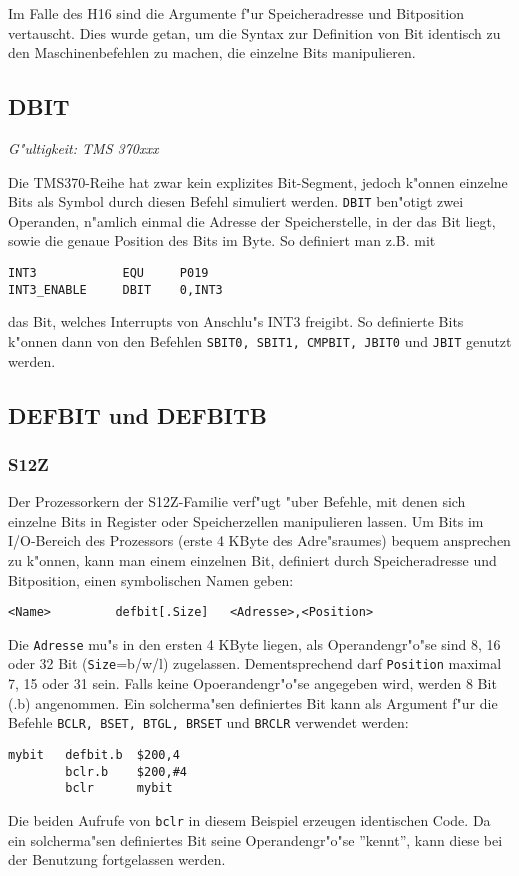 \documentclass[12pt,a4paper,twoside]{report}
\makeatletter
\newcommand{\tty}[1]{{\tt #1}}
\newcommand{\ttindex}[1]{\index{#1@{\tt #1}}}
\makeatother
\begin{document}
Im Falle des H16 sind die Argumente f"ur Speicheradresse und Bitposition
vertauscht.  Dies wurde getan, um die Syntax zur Definition von Bit identisch
zu den Maschinenbefehlen zu machen, die einzelne Bits manipulieren.


\subsection{DBIT}
\ttindex{DBIT}

{\em G"ultigkeit: TMS 370xxx}

Die TMS370-Reihe hat zwar kein explizites Bit-Segment, jedoch k"onnen
einzelne Bits als Symbol durch diesen Befehl simuliert werden.  \tty{DBIT}
ben"otigt zwei Operanden, n"amlich einmal die Adresse der Speicherstelle,
in der das Bit liegt, sowie die genaue Position des Bits im Byte.
So definiert man z.B. mit
\begin{verbatim}
INT3            EQU     P019
INT3_ENABLE     DBIT    0,INT3
\end{verbatim}
das Bit, welches Interrupts von Anschlu"s INT3 freigibt.  So definierte
Bits k"onnen dann von den Befehlen \tty{SBIT0, SBIT1, CMPBIT, JBIT0}
und \tty{JBIT} genutzt werden.


\subsection{DEFBIT und DEFBITB}
\ttindex{DEFBIT}
\ttindex{DEFBITB}

\subsubsection{S12Z}

Der Prozessorkern der S12Z-Familie verf"ugt "uber Befehle, mit denen
sich einzelne Bits in Register oder Speicherzellen manipulieren
lassen.  Um Bits im I/O-Bereich des Prozessors (erste 4 KByte des
Adre"sraumes) bequem ansprechen zu k"onnen, kann man einem einzelnen
Bit, definiert durch Speicheradresse und Bitposition, einen
symbolischen Namen geben:
\begin{verbatim}
<Name>         defbit[.Size]   <Adresse>,<Position>
\end{verbatim}
Die \tty{Adresse} mu"s in den ersten 4 KByte liegen, als Operandengr"o"se
sind 8, 16 oder 32 Bit (\tty{Size}=b/w/l) zugelassen.
Dementsprechend darf \tty{Position} maximal 7, 15 oder 31 sein. 
Falls keine Opoerandengr"o"se angegeben wird, werden 8 Bit (.b)
angenommen.  Ein solcherma"sen definiertes Bit kann als Argument f"ur
die Befehle {\tt BCLR, BSET, BTGL, BRSET} und {\tt BRCLR} verwendet
werden:
\begin{verbatim}
mybit   defbit.b  $200,4
        bclr.b    $200,#4
        bclr      mybit
\end{verbatim}
Die beiden Aufrufe von {\tt bclr} in diesem Beispiel erzeugen
identischen Code.  Da ein solcherma"sen definiertes Bit seine
Operandengr"o"se ''kennt'', kann diese bei der Benutzung fortgelassen
werden.
\end{document}
